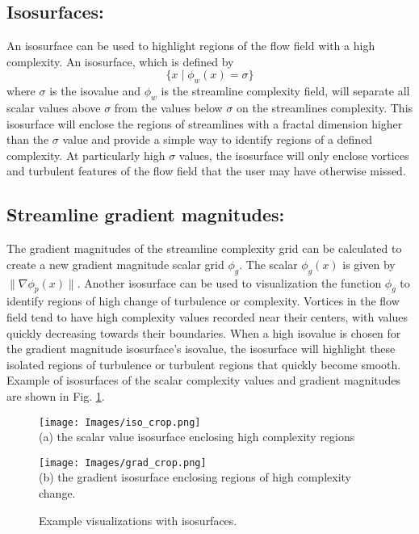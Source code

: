 \documentclass{egpubl}
\begin{document}
\subsection{Isosurfaces:} 
An isosurface can be used to highlight regions of the flow field with a high complexity.
An isosurface, which is defined by
\begin{equation} \{ x \mid \phi_w(x) = \sigma \}\end{equation}
where $\sigma$ is the isovalue and $\phi_w$ is the streamline complexity field, will separate all scalar values above $\sigma$ from the values below $\sigma$ on the streamlines complexity.
This isosurface will enclose the regions of streamlines with a fractal dimension higher than the $\sigma$ value and provide a simple way to identify regions of a defined complexity.
At particularly high $\sigma$ values, the isosurface will only enclose vortices and turbulent features of the flow field that the user may have otherwise missed.

\subsection{Streamline gradient magnitudes:}
The gradient magnitudes of the streamline complexity grid can be calculated to create a new gradient magnitude scalar grid $\phi_g$.
The scalar $\phi_g(x)$ is given by $\| \nabla \phi_p(x) \|$.
Another isosurface can be used to visualization the function $\phi_g$ to identify regions of high change of turbulence or complexity.
Vortices in the flow field tend to have high complexity values recorded near their centers, with values quickly decreasing towards their boundaries.
When a high isovalue is chosen for the gradient magnitude isosurface's isovalue, the isosurface will highlight these isolated regions of turbulence or turbulent regions that quickly become smooth.
Example of isosurfaces of the scalar complexity values and gradient magnitudes are shown in Fig. \ref{fig:iso}.

\begin{figure}[h]
        \centering
                \begin{minipage}{0.47\linewidth}
                        \small
                        \texttt{[image: Images/iso\_crop.png]}\\(a) the scalar value isosurface enclosing high complexity regions\vspace{0.2em}
                \end{minipage}
                \begin{minipage}{0.47\linewidth}
                        \small
                        \texttt{[image: Images/grad\_crop.png]}\\(b) the gradient isosurface enclosing regions of high complexity change. \vspace{0.2em}
                \end{minipage}
        \caption{Example visualizations with isosurfaces.}
        \label{fig:iso}
\end{figure}
\end{document}
